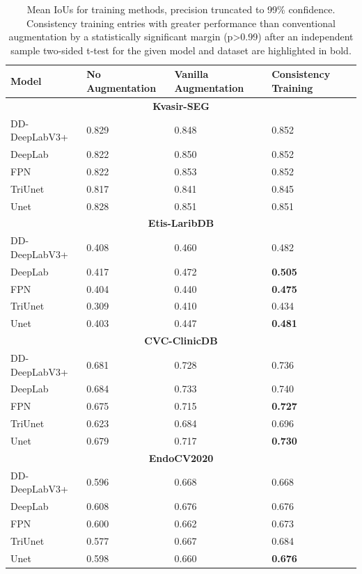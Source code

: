 \begin{table}[ht]
    \centering
\begin{tabularx}{\linewidth}{llXX}
\toprule
\textbf{Model} & \textbf{No Augmentation} & \textbf{Vanilla Augmentation} & \textbf{Consistency Training}\\
\toprule
\multicolumn{4}{c}{\textbf{Kvasir-SEG  }}\\
\midrule

        DD-DeepLabV3+& 0.829 & 0.848 & 0.852 \\
        DeepLab& 0.822 & 0.850 & 0.852 \\
        FPN& 0.822 & 0.853 & 0.852 \\
        TriUnet& 0.817 & 0.841 & 0.845 \\
        Unet& 0.828 & 0.851 & 0.851 \\
\midrule
\multicolumn{4}{c}{\textbf{Etis-LaribDB}}\\
\midrule
        DD-DeepLabV3+& 0.408 & 0.460 & 0.482 \\
        DeepLab& 0.417 & 0.472 & \textbf{0.505} \\
        FPN& 0.404 & 0.440 & \textbf{0.475} \\
        TriUnet& 0.309 & 0.410 & 0.434 \\
        Unet& 0.403 & 0.447 & \textbf{0.481} \\
\midrule
\multicolumn{4}{c}{\textbf{CVC-ClinicDB}}\\
\midrule
        DD-DeepLabV3+ & 0.681 & 0.728 & 0.736 \\
        DeepLab & 0.684 & 0.733 & 0.740 \\
        FPN& 0.675 & 0.715 & \textbf{0.727} \\
        TriUnet& 0.623 & 0.684 & 0.696 \\
        Unet& 0.679 & 0.717 & \textbf{0.730} \\
\midrule
\multicolumn{4}{c}{\textbf{EndoCV2020}}\\
\midrule
        DD-DeepLabV3+& 0.596 & 0.668 & 0.668 \\
        DeepLab& 0.608 & 0.676 & 0.676 \\
        FPN& 0.600 & 0.662 & 0.673 \\
        TriUnet& 0.577 & 0.667 & 0.684 \\
        Unet& 0.598 & 0.660 & \textbf{0.676 }\\
\bottomrule
    \end{tabularx}
    \caption{Mean IoUs for training methods, precision truncated to 99\% confidence. Consistency training entries with greater performance than conventional augmentation by a statistically significant margin (p>0.99) after an independent sample two-sided t-test for the given model and dataset are highlighted in bold.}
    \label{tab:aug_ious}
\end{table}

